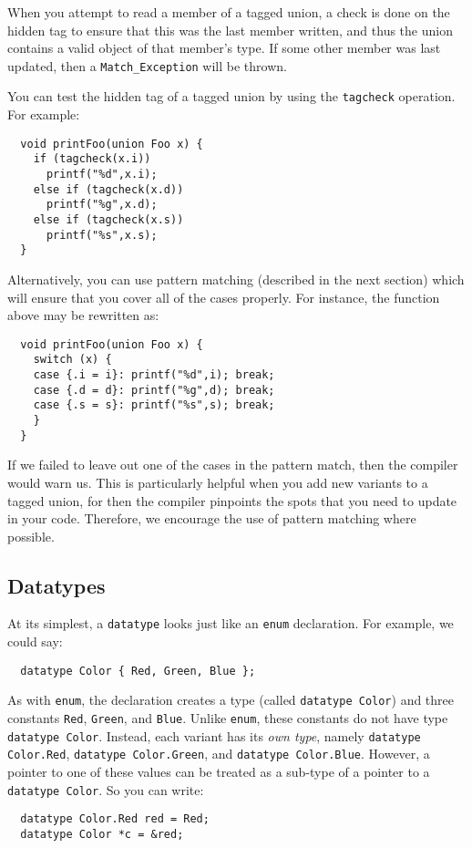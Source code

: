 When you attempt to read a member of a tagged union, a
check is done on the hidden tag to ensure that this was
the last member written, and thus the union contains a
valid object of that member's type.  If some other member
was last updated, then a \texttt{Match_Exception} will
be thrown.  

You can test the hidden tag of a tagged union by using
the \texttt{tagcheck} operation.  For example:
\begin{verbatim}
  void printFoo(union Foo x) {
    if (tagcheck(x.i))
      printf("%d",x.i);
    else if (tagcheck(x.d))
      printf("%g",x.d);
    else if (tagcheck(x.s))
      printf("%s",x.s);
  }
\end{verbatim}
Alternatively, you can use pattern matching (described
in the next section) which will ensure that you cover
all of the cases properly.  For instance, the function
above may be rewritten as:
\begin{verbatim}
  void printFoo(union Foo x) {
    switch (x) {
    case {.i = i}: printf("%d",i); break;
    case {.d = d}: printf("%g",d); break;
    case {.s = s}: printf("%s",s); break;
    }
  }
\end{verbatim}
If we failed to leave out one of the cases in the
pattern match, then the compiler would warn us.  This
is particularly helpful when you add new variants to
a tagged union, for then the compiler pinpoints the
spots that you need to update in your code.  Therefore,
we encourage the use of pattern matching where possible.

\subsection{Datatypes}\hypertarget{datatype_sec}{}

At its simplest, a \texttt{datatype} looks just like an \texttt{enum} 
declaration.  For example, we could say:
\begin{verbatim}
  datatype Color { Red, Green, Blue };
\end{verbatim}

As with \texttt{enum}, the declaration creates a type (called
\texttt{datatype Color}) and three constants \texttt{Red}, \texttt{Green}, and
\texttt{Blue}.  Unlike \texttt{enum}, these constants do not have type
\texttt{datatype Color}.  Instead, each variant has its \textit{own type},
namely \texttt{datatype Color.Red}, \texttt{datatype Color.Green}, and
\texttt{datatype Color.Blue}.  However, a pointer to one of these values
can be treated as a sub-type of a pointer to a 
\texttt{datatype Color}.  So you can write:
\begin{verbatim}
  datatype Color.Red red = Red;
  datatype Color *c = &red;
\end{verbatim}

